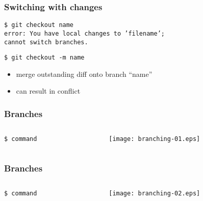 \documentclass[english]{beamer}
\newcommand{\CMD}[1]{%
\texttt{\textcolor{code-green}{#1}}%
}
\newcommand{\cmd}[1]{%
\texttt{\textcolor{code-orange}{#1}}%
}
\newcommand{\err}[1]{%
\texttt{\textcolor{code-red}{#1}}%
}
\newcommand{\error}[1]{%
\textcolor{code-red}{#1}%
}
\begin{document}
\begin{frame}
\frametitle{Switching with changes}

\CMD{\$ git checkout name} \\
\err{error: You have local changes to 'filename'; \\
cannot switch branches.}

\pause{}
\vspace{\baselineskip}
\CMD{\$ git checkout -m name}
\begin{itemize}
        \item merge outstanding diff onto branch ``name''
        \item can result in \error{conflict}
\end{itemize}

\end{frame}

\begin{frame}
\frametitle{Branches}

\begin{columns}[t]
        \begin{column}[T]{.5\textwidth}
                \cmd{\$ command} \\
        \end{column}
        \begin{column}[T]{.5\textwidth}
                \texttt{[image: branching-01.eps]}
        \end{column}
\end{columns}
\end{frame}

\begin{frame}
\frametitle{Branches}

\begin{columns}[t]
        \begin{column}[T]{.5\textwidth}
                \cmd{\$ command} \\
        \end{column}
        \begin{column}[T]{.5\textwidth}
                \texttt{[image: branching-02.eps]}
        \end{column}
\end{columns}
\end{frame}
\end{document}
